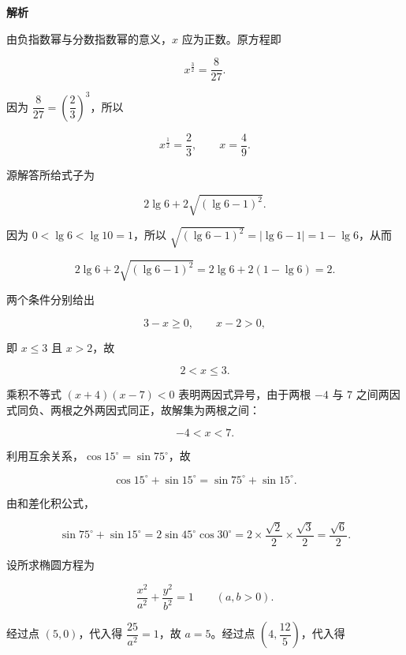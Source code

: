\begin{answer}
\textbf{解析}


由负指数幂与分数指数幂的意义，$x$ 应为正数。原方程即

\nopagebreak[4]
\[
x^{\frac32}=\frac{8}{27}.
\]

因为 $\dfrac{8}{27}=\left(\dfrac23\right)^3$，所以

\nopagebreak[4]
\[
x^{\frac12}=\dfrac23,
\qquad
x=\dfrac49.
\]


源解答所给式子为

\nopagebreak[4]
\[
2\lg6+2\sqrt{(\lg6-1)^2}.
\]

因为 $0<\lg6<\lg10=1$，所以 $\sqrt{(\lg6-1)^2}=|\lg6-1|=1-\lg6$，从而

\nopagebreak[4]
\[
2\lg6+2\sqrt{(\lg6-1)^2}
=2\lg6+2(1-\lg6)=2.
\]


两个条件分别给出

\nopagebreak[4]
\[
3-x\ge0,
\qquad
x-2>0,
\]

即 $x\le3$ 且 $x>2$，故

\nopagebreak[4]
\[
2<x\le3.
\]


乘积不等式 $(x+4)(x-7)<0$ 表明两因式异号，由于两根 $-4$ 与 $7$ 之间两因式同负、两根之外两因式同正，故解集为两根之间：

\nopagebreak[4]
\[
-4<x<7.
\]


利用互余关系，$\cos15^\circ=\sin75^\circ$，故

\nopagebreak[4]
\[
\cos15^\circ+\sin15^\circ=\sin75^\circ+\sin15^\circ.
\]

由和差化积公式，

\nopagebreak[4]
\[
\sin75^\circ+\sin15^\circ
=2\sin45^\circ\cos30^\circ
=2\times\frac{\sqrt2}{2}\times\frac{\sqrt3}{2}
=\frac{\sqrt6}{2}.
\]


设所求椭圆方程为

\nopagebreak[4]
\[
\frac{x^2}{a^2}+\frac{y^2}{b^2}=1
\qquad(a,b>0).
\]

经过点 $(5,0)$，代入得 $\dfrac{25}{a^2}=1$，故 $a=5$。经过点 $\left(4,\dfrac{12}{5}\right)$，代入得


\end{answer}
